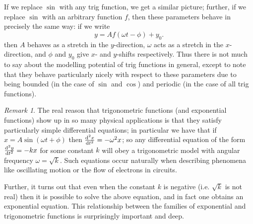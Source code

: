\documentclass[a4paper,leqno]{article}
\numberwithin{equation}{section}
\theoremstyle{definition}
\theoremstyle{remark}
\newtheorem{rem}[equation]{Remark}
\begin{document}
\begin{center}
\end{center}

If we replace $ \sin $ with any trig function, we get a similar picture; further, if we replace $ \sin $
with an arbitrary function $ f $, then these parameters behave in precisely the same way: if we write
\begin{equation}
  y = Af(\omega t - \phi) + y_0.
\end{equation}
then $ A $ behaves as a stretch in the $ y$-direction, $ \omega $ acts as a stretch in the $ x$-direction,
and $ \phi $ and $ y_0 $ give $ x$- and $ y$-shifts respectively. Thus there is not much to say about
the modelling potential of trig functions in general, except to note that they behave particularly nicely
with respect to these parameters due to being bounded (in the case of $ \sin $ and $ \cos $) and periodic
(in the case of all trig functions).

\begin{rem}
  The real reason that trigonometric functions (and exponential functions) show up in so many
  physical applications is that they satisfy particularly simple differential equations; in particular
  we have that if $ x = A\sin(\omega t + \phi) $ then $ \od[2]{x}{t} = -\omega^2 x $; so any differential
  equation of the form $ \od[2]{y}{t} = -kx $ for some constant $ k $ will obey a trigonometric
  model with angular frequency $ \omega = \sqrt{k} $. Such equations occur naturally when describing phenomena like
  oscillating motion or the flow of electrons in circuits.

  Further, it turns out that even when the constant $ k $ is negative (i.e. $ \sqrt{k} $ is not real) then
  it is possible to solve the above equation, and in fact one obtains an exponential equation. This relationship
  between the families of exponential and trigonometric functions is surprisingly important and deep.
\end{rem}
\end{document}
